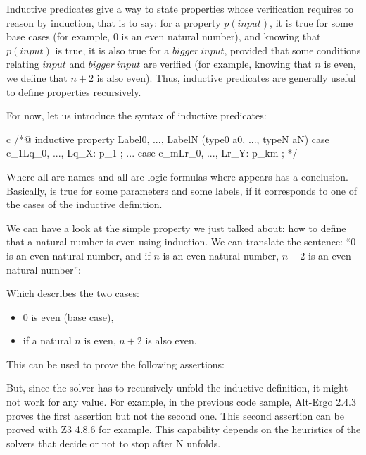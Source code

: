 Inductive predicates give a way to state properties whose verification requires
to reason by induction, that is to say: for a property $p(input)$, it is true
for some base cases (for example, $0$ is an even natural number), and knowing
that $p(input)$ is true, it is also true for a $bigger\ input$, provided that
some conditions relating $input$ and $bigger\ input$ are verified (for example,
knowing that $n$ is even, we define that $n+2$ is also even). Thus, inductive
predicates are generally useful to define properties recursively.


For now, let us introduce the syntax of inductive predicates:

\begin{CodeBlock}{c}
/*@
  inductive property{ Label0, ..., LabelN }(type0 a0, ..., typeN aN) {
  case c_1{Lq_0, ..., Lq_X}: p_1 ;
  ...
  case c_m{Lr_0, ..., Lr_Y}: p_km ;
  }
*/
\end{CodeBlock}

Where all  are names and all  are logic
formulas where  appears has a conclusion. Basically,
 is true for some parameters and some labels, if it
corresponds to one of the cases of the inductive definition.

We can have a look at the simple property we just talked about: how to define
that a natural number is even using induction. We can translate the sentence:
``0 is an even natural number, and if $n$ is an even natural number, $n+2$ is
an even natural number'':




Which describes the two cases:
\begin{itemize}
\item $0$ is even (base case),
\item if a natural $n$ is even, $n+2$ is also even.
\end{itemize}


This can be used to prove the following assertions:




But, since the solver has to recursively unfold the inductive definition, it
might not work for any value. For example, in the previous code sample,
Alt-Ergo 2.4.3 proves the first assertion but not the second one. This second
assertion can be proved with Z3 4.8.6 for example. This capability depends on
the heuristics of the solvers that decide or not to stop after N unfolds.


